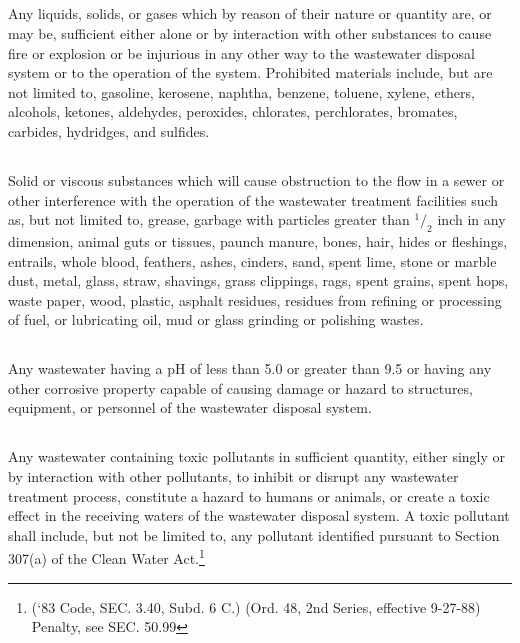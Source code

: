\subsection{}
Any liquids, solids, or gases which by reason of their nature or quantity are, or may be, sufficient either alone or by interaction with other substances to cause fire or explosion or be injurious in any other way to the wastewater disposal system or to the operation of the system.  Prohibited materials include, but are not limited to, gasoline, kerosene, naphtha, benzene, toluene, xylene, ethers, alcohols, ketones, aldehydes, peroxides, chlorates, perchlorates, bromates, carbides, hydridges, and sulfides.
\subsection{}
Solid or viscous substances which will cause obstruction to the flow in a sewer or other interference with the operation of the wastewater treatment facilities such as, but not limited to, grease, garbage with particles greater than ${^1/_2}$ inch in any dimension, animal guts or tissues, paunch manure, bones, hair, hides or fleshings, entrails, whole blood, feathers, ashes, cinders, sand, spent lime, stone or marble dust, metal, glass, straw, shavings, grass clippings, rags, spent grains, spent hops, waste paper, wood, plastic, asphalt residues, residues from refining or processing of fuel, or lubricating oil, mud or glass grinding or polishing wastes.
\subsection{}
Any wastewater having a pH of less than 5.0 or greater than 9.5 or having any other corrosive property capable of causing damage or hazard to structures, equipment, or personnel of the wastewater disposal system.
\subsection{}
Any wastewater containing toxic pollutants in sufficient quantity, either singly or by interaction with other pollutants, to inhibit or disrupt any wastewater treatment process, constitute a hazard to humans or animals, or create a toxic effect in the receiving waters of the wastewater disposal system.  A toxic pollutant shall include, but not be limited to, any pollutant identified pursuant to Section 307(a) of the Clean Water Act.\footnote{(‘83 Code, SEC. 3.40, Subd. 6 C.) (Ord. 48, 2nd Series, effective 9-27-88) Penalty, see SEC. 50.99}

